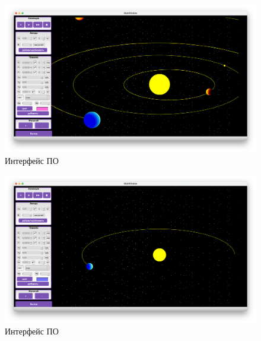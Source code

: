     \begin{figure}[h!]
            \centering
            \includegraphics[scale=0.35]{inc/PO_1.png}
            \caption{Интерфейс ПО}
            \label{img:PO_1}
    \end{figure}\clearpage

    \begin{figure}[h!]
            \centering
            \includegraphics[scale=0.35]{inc/PO_2.png}
            \caption{Интерфейс ПО}
            \label{img:PO_2}
    \end{figure}\clearpage

